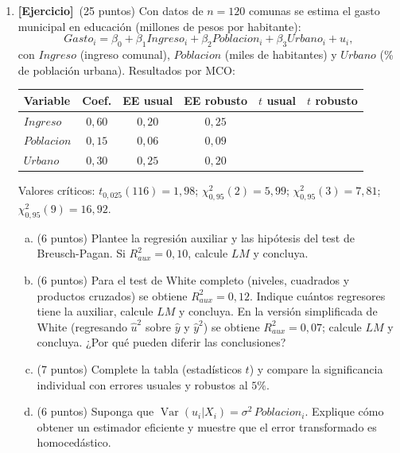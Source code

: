 \documentclass[12pt,letterpaper]{article}
\DeclareMathOperator{\var}{Var}
\newcommand{\ejer}{\textbf{[Ejercicio]}}
\begin{document}
\begin{enumerate}[1.]
\item \ejer\ (25 puntos) Con datos de $n=120$ comunas se estima el gasto municipal en educación (millones de pesos por habitante):
\[
Gasto_i=\beta_0+\beta_1Ingreso_i+\beta_2Poblacion_i+\beta_3Urbano_i+u_i ,
\]
con $Ingreso$ (ingreso comunal), $Poblacion$ (miles de habitantes) y $Urbano$ (\% de población urbana). Resultados por MCO:
\begin{center}
\begin{tabular}{lccccc}
\toprule
Variable & Coef. & EE usual & EE robusto & $t$ usual & $t$ robusto\\
\midrule
$Ingreso$   & $0{,}60$ & $0{,}20$ & $0{,}25$ & & \\
$Poblacion$ & $0{,}15$ & $0{,}06$ & $0{,}09$ & & \\
$Urbano$    & $0{,}30$ & $0{,}25$ & $0{,}20$ & & \\
\bottomrule
\end{tabular}
\end{center}
Valores críticos: $t_{0{,}025}(116)=1{,}98$; $\chi^2_{0{,}95}(2)=5{,}99$; $\chi^2_{0{,}95}(3)=7{,}81$; $\chi^2_{0{,}95}(9)=16{,}92$.
\begin{enumerate}[a)]
\item (6 puntos) Plantee la regresión auxiliar y las hipótesis del test de Breusch-Pagan. Si $R^2_{aux}=0{,}10$, calcule $LM$ y concluya.
\item (6 puntos) Para el test de White completo (niveles, cuadrados y productos cruzados) se obtiene $R^2_{aux}=0{,}12$. Indique cuántos regresores tiene la auxiliar, calcule $LM$ y concluya. En la versión simplificada de White (regresando $\hat u^2$ sobre $\hat y$ y $\hat y^2$) se obtiene $R^2_{aux}=0{,}07$; calcule $LM$ y concluya. ¿Por qué pueden diferir las conclusiones?
\item (7 puntos) Complete la tabla (estadísticos $t$) y compare la significancia individual con errores usuales y robustos al $5\%$.
\item (6 puntos) Suponga que $\var(u_i|X_i)=\sigma^2\,Poblacion_i$. Explique cómo obtener un estimador eficiente y muestre que el error transformado es homocedástico.
\end{enumerate}


\end{enumerate}
\end{document}
